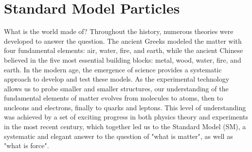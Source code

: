 
\section{Standard Model Particles}
\label{sec:relatedWorks:smParticles}

What is the world made of? Throughout the history, numerous theories were developed to answer the question. The ancient Greeks modeled the matter with four fundamental elements: air, water, fire, and earth, while the ancient Chinese believed in the five most essential building blocks: metal, wood, water, fire, and earth. In the modern age, the emergence of science provides a systematic approach to develop and test these models. As the experimental technology allows us to probe smaller and smaller structures, our understanding of the fundamental elements of matter evolves from molecules to atoms, then to nucleons and electrons, finally to quarks and leptons. This level of understanding was achieved by a set of exciting progress in both physics theory and experiments in the most recent century, which together led us to the Standard Model (SM), a systematic and elegant answer to the question of "what is matter", as well as "what is force".



